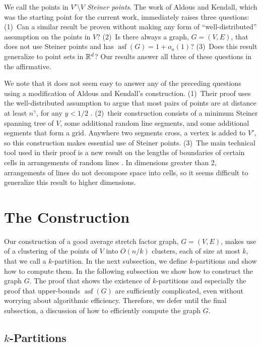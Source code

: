 \documentclass{patmorin}
\DeclareMathOperator{\asf}{asf}
\begin{document}
We call the points in $V'\setminus V$ \emph{Steiner points}.  The work of
Aldous and Kendall, which was the starting point for the current work,
immediately raises three questions: (1)~Can a similar result be proven
without making any form of ``well-distributed'' assumption on the points
in $V$? (2)~Is there always a graph, $G=(V,E)$, that does not use Steiner
points and has $\asf(G)=1+o_n(1)$? (3)~Does this result generalize to
point sets in $\mathbb{R}^d$?  Our results answer all three of these questions
in the affirmative.

We note that it does not seem easy to answer any of the preceding
questions using a modification of Aldous and Kendall's construction.
(1)~Their proof uses the well-distributed assumption to argue that
most pairs of points are at distance at least $n^{\gamma}$, for any
$y<1/2$ \cite[Section~5.3]{aldous.kendall:short-length}.  (2)~their
construction consists of a minimum Steiner spanning tree of $V$,
some additional random line segments, and some additional segments
that form a grid.  Anywhere two segments cross, a vertex is added
to $V'$, so this construction makes essential use of Steiner points.
(3)~The main technical tool used in their proof is a new result on the
lengths of boundaries of certain cells in arrangements of random lines
\cite[Theorems~3 and 4]{aldous.kendall:short-length}.  In dimensions
greater than 2, arrangements of lines do not decompose space into cells,
so it seems difficult to generalize this result to higher dimensions.

\section{The Construction}

Our construction of a good average stretch factor graph, $G=(V,E)$,
makes use of a clustering of the points of $V$ into $O(n/k)$ clusters,
each of size at most $k$, that we call a $k$-partition.  In the next
subsection, we define $k$-partitions and show how to compute them.
In the following subsection we show how to construct the graph $G$.
The proof that shows the existence of $k$-partitions and especially
the proof that upper-bounds $\asf(G)$ are sufficiently complicated,
even without worrying about algorithmic efficiency.  Therefore, we defer
until the final subsection, a discussion of how to efficiently compute
the graph $G$.


\subsection{$k$-Partitions}
\end{document}
